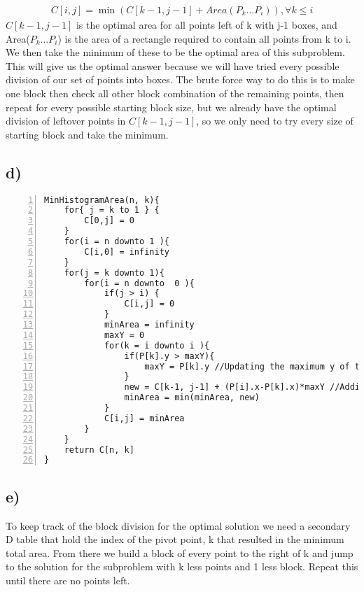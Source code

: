 \documentclass[12pt]{article}
\begin{document}
\begin{eqnarray*}
    C[i, j] = \min(C[k-1, j-1] + Area(P_k \dots P_i)), \forall k \leq i
\end{eqnarray*}
$C[k-1, j-1]$ is the optimal area for all points left of k with j-1 boxes, and Area($P_k \dots P_i$) is the area of a rectangle required to contain all points from k to i. We then take the minimum of these to be the optimal area of this subproblem. This will give us the optimal answer because we will have tried every possible division of our set of points into boxes. The brute force way to do this is to make one block then check all other block combination of the remaining points, then repeat for every possible starting block size, but we already have the optimal division of leftover points in $C[k-1, j-1]$, so we only need to try every size of starting block and take the minimum.

\subsection*{d)}
\begin{Verbatim}[numbers=left]
MinHistogramArea(n, k){
    for{ j = k to 1 } {
        C[0,j] = 0
    }
    for(i = n downto 1 ){
        C[i,0] = infinity
    }
    for(j = k downto 1){
        for(i = n downto  0 ){
            if(j > i) {
                C[i,j] = 0
            }
            minArea = infinity
            maxY = 0
            for(k = i downto i ){
                if(P[k].y > maxY){
                    maxY = P[k].y //Updating the maximum y of the right most block
                }
                new = C[k-1, j-1] + (P[i].x-P[k].x)*maxY //Adding the area of the right most block to the optimal area of remaining points
                minArea = min(minArea, new)
            }
            C[i,j] = minArea
        }
    }
    return C[n, k]
}
\end{Verbatim}


\subsection*{e)}
To keep track of the block division for the optimal solution we need a secondary D table that hold the index of the pivot point, k that resulted in the minimum total area. From there we build a block of every point to the right of k and jump to the solution for the subproblem with k less points and 1 less block. Repeat this until there are no points left.
\end{document}
